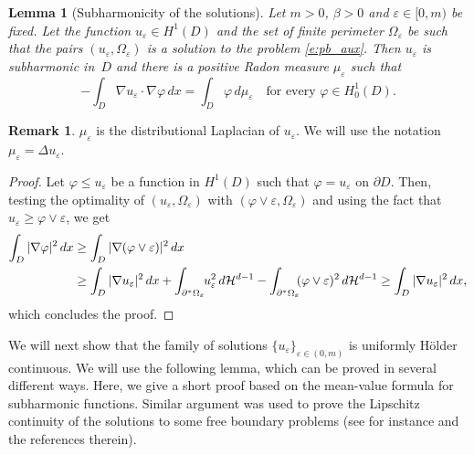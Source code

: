 \documentclass[JEP,XML,SOM,Unicode]{cedram}
\theoremstyle{plain}
\newtheorem{lemma}[teo]{Lemma}
\theoremstyle{definition}
\newtheorem{oss}[teo]{Remark}
\let\eps\varepsilon
\def\HH{\mathcal{H}}
\begin{document}
\begin{lemma}[Subharmonicity of the solutions]\label{l:subharmonicity}
Let $m>0$, $\beta>0$ and $\eps\in[0,m)$ be fixed. Let the function $u_\eps\in H^1(D)$ and the set of finite perimeter $\Omega_\eps$ be such that the pairs $(u_\eps,\Omega_\eps)$ is a solution to the problem \eqref{e:pb_aux}. Then $u_\eps$ is subharmonic in~$D$ and there is a positive Radon measure $\mu_\eps$ such that
\[-\int_{D}\nabla u_\eps\cdot\nabla \varphi\,dx=\int_{D}\varphi\,d\mu_\eps\quad\text{for every } \varphi\in H^1_0(D).\]
\end{lemma}
\begin{oss}
$\mu_\eps$ is the distributional Laplacian of $u_\eps$. We will use the notation $\mu_\eps=\Delta u_\eps$.
\end{oss}
\begin{proof}
Let $\varphi\le u_\eps$ be a function in $H^1(D)$ such that $\varphi=u_\eps$ on $\partial D$. Then, testing the optimality of $(u_\eps,\Omega_\eps)$ with $(\varphi\vee\eps,\Omega_\eps)$ and using the fact that $u_\eps\ge \varphi\vee\eps$, we get
\begin{align*}
\int_D|\nabla \varphi|^2\,dx&\ge \int_D|\nabla (\varphi\vee \eps)|^2\,dx\\
&\ge \int_D|\nabla u_\eps|^2\,dx +\int_{\partial^\ast\Omega_\eps}\hspace*{-1mm}u_\eps^2\,d\HH^{d-1}-\int_{\partial^\ast\Omega_\eps}\hspace*{-1mm}(\varphi\vee \eps)^2\,d\HH^{d-1}\ge \int_D|\nabla u_\eps|^2\,dx,
\end{align*}
which concludes the proof.
\end{proof}

We will next show that the family of solutions $\big\{u_\eps\big\}_{\eps\in(0,m)}$ is uniformly Hölder continuous.
We will use the following lemma, which can be proved in several different ways. Here, we give a short proof based on the mean-value formula for subharmonic functions. Similar argument was used to prove the Lipschitz continuity of the solutions to some free boundary problems (see for instance \cite{velectures} and the references therein).
\end{document}
